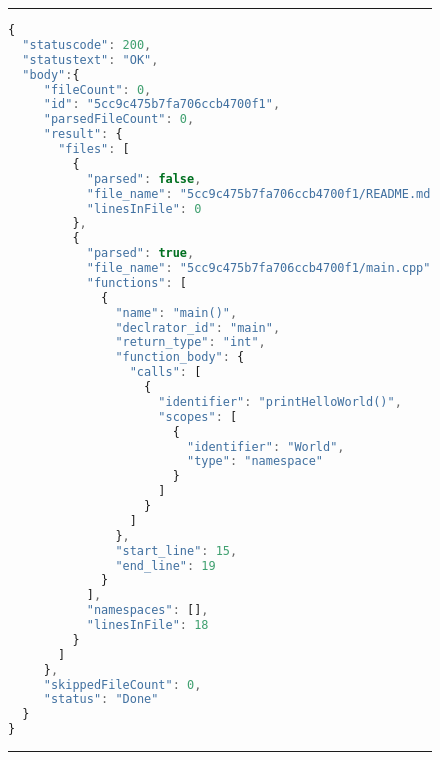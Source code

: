 \begin{figure}
\noindent\rule{\textwidth}{1pt}
\begin{lstlisting}[language=JavaScript, caption= {JSON structure from api}, label={lst:apiFormat}]
{
  "statuscode": 200,
  "statustext": "OK",
  "body":{
     "fileCount": 0,
     "id": "5cc9c475b7fa706ccb4700f1",
     "parsedFileCount": 0,
     "result": {
       "files": [
         {
           "parsed": false,
           "file_name": "5cc9c475b7fa706ccb4700f1/README.md",
           "linesInFile": 0
         },
         {
           "parsed": true,
           "file_name": "5cc9c475b7fa706ccb4700f1/main.cpp",
           "functions": [
             {
               "name": "main()",
               "declrator_id": "main",
               "return_type": "int",
               "function_body": {
                 "calls": [
                   {
                     "identifier": "printHelloWorld()",
                     "scopes": [
                       {
                         "identifier": "World",
                         "type": "namespace"
                       }
                     ]
                   }
                 ]
               },
               "start_line": 15,
               "end_line": 19
             }
           ],
           "namespaces": [],
           "linesInFile": 18
         }
       ]
     },
     "skippedFileCount": 0,
     "status": "Done"
  }
}
\end{lstlisting}
\noindent\rule{\textwidth}{1pt}
\end{figure}